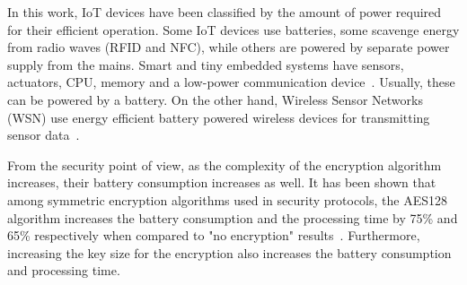 \documentclass[final]{siamltex}
\begin{document}
In this work, IoT devices have been classified by the amount of power required
for their efficient operation. Some IoT devices use batteries, some scavenge
energy from radio waves (RFID and NFC), while others are powered by separate
power supply from the mains.  Smart and tiny embedded systems
have sensors, actuators, CPU, memory and a low-power communication
device~\cite{lopez2012adding}. Usually, these can be powered by a battery. On
the other hand, Wireless Sensor Networks (WSN)
use energy efficient battery powered wireless devices for transmitting
sensor data~\cite{akyildiz2002wireless}.

From the security point of view, as the complexity of the encryption algorithm
increases, their battery consumption increases as well. It has been shown that
among symmetric encryption algorithms used in security protocols, the AES128 algorithm
increases the battery consumption and the processing time by 75\% and 65\%
respectively when compared to "no encryption" results~\cite{hamad2009energy}.
Furthermore, increasing the key size for the encryption also increases the
battery consumption and processing time.




\end{document}
